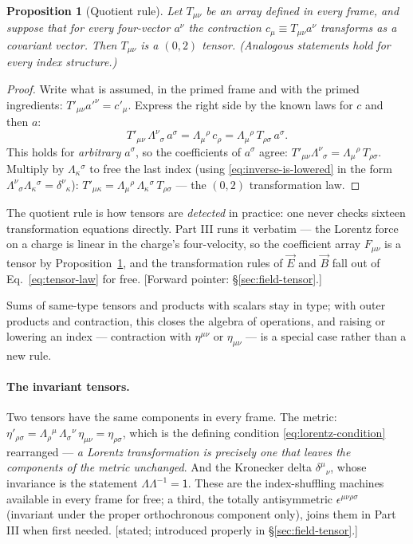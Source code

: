 \documentclass[11pt]{article}
\theoremstyle{plain}
\newtheorem{proposition}[theorem]{Proposition}
\theoremstyle{definition}
\theoremstyle{remark}
\newcommand{\vE}{\vec{E}}
\newcommand{\vB}{\vec{B}}
\begin{document}
\begin{proposition}[Quotient rule]\label{prop:quotient}
Let $T_{\mu\nu}$ be an array defined in every frame, and suppose that
for \emph{every} four-vector $a^\nu$ the contraction
$c_\mu \equiv T_{\mu\nu}a^\nu$ transforms as a covariant vector. Then
$T_{\mu\nu}$ is a $(0,2)$ tensor. (Analogous statements hold for every
index structure.)
\end{proposition}

\begin{proof}
Write what is assumed, in the primed frame and with the primed
ingredients: $T'_{\mu\nu}a'^\nu = c'_\mu$. Express the right side by
the known laws for $c$ and then $a$:
\begin{equation}
  T'_{\mu\nu}\,\Lambda^\nu{}_\sigma\, a^\sigma
  = \Lambda_\mu{}^\rho\, c_\rho
  = \Lambda_\mu{}^\rho\, T_{\rho\sigma}\, a^\sigma .
\end{equation}
This holds for \emph{arbitrary} $a^\sigma$, so the coefficients of
$a^\sigma$ agree:
$T'_{\mu\nu}\Lambda^\nu{}_\sigma
= \Lambda_\mu{}^\rho\, T_{\rho\sigma}$. Multiply by
$\Lambda_\kappa{}^\sigma$ to free the last index (using
\eqref{eq:inverse-is-lowered} in the form
$\Lambda^\nu{}_\sigma\Lambda_\kappa{}^\sigma = \delta^\nu{}_\kappa$):
$T'_{\mu\kappa} = \Lambda_\mu{}^\rho\,
\Lambda_\kappa{}^\sigma\, T_{\rho\sigma}$ --- the $(0,2)$
transformation law.
\end{proof}

\noindent
The quotient rule is how tensors are \emph{detected} in practice: one
never checks sixteen transformation equations directly. Part III runs
it verbatim --- the Lorentz force on a charge is linear in the
charge's four-velocity, so the coefficient array $F_{\mu\nu}$ is a
tensor by Proposition~\ref{prop:quotient}, and the transformation
rules of $\vE$ and $\vB$ fall out of Eq.~\eqref{eq:tensor-law} for
free. [Forward pointer: \S\ref{sec:field-tensor}.]

Sums of same-type tensors and products with scalars stay in type;
with outer products and contraction, this closes the algebra of
operations, and raising or lowering an index --- contraction with
$\eta^{\mu\nu}$ or $\eta_{\mu\nu}$ --- is a special case rather than a
new rule.

\paragraph{The invariant tensors.} Two tensors have the same
components in every frame. The metric:
$\eta'_{\rho\sigma} =
\Lambda_\rho{}^\mu\, \Lambda_\sigma{}^\nu\, \eta_{\mu\nu}
= \eta_{\rho\sigma}$, which is the defining condition
\eqref{eq:lorentz-condition} rearranged --- \emph{a Lorentz
transformation is precisely one that leaves the components of the
metric unchanged}. And the Kronecker delta $\delta^\mu{}_\nu$, whose
invariance is the statement $\Lambda\Lambda^{-1} = \mathsf 1$. These
are the index-shuffling machines available in every frame for free; a
third, the totally antisymmetric $\epsilon^{\mu\nu\rho\sigma}$
(invariant under the proper orthochronous component only), joins them
in Part III when first needed. [stated; introduced properly in
\S\ref{sec:field-tensor}.]
\end{document}
